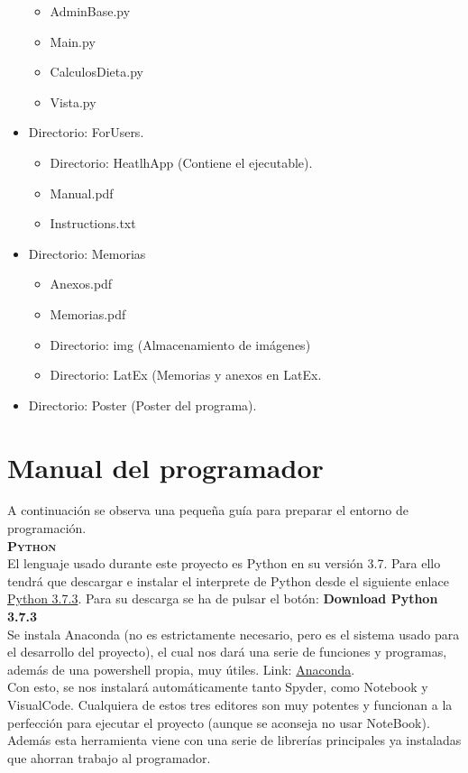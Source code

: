 \begin{itemize}
\begin{itemize}
\item AdminBase.py
\item Main.py
\item CalculosDieta.py
\item Vista.py
\end{itemize}
\item Directorio: ForUsers.
\begin{itemize}
\item Directorio: HeatlhApp (Contiene el ejecutable).
\item Manual.pdf
\item Instructions.txt
\end{itemize}
\item Directorio: Memorias
\begin{itemize}
\item Anexos.pdf
\item Memorias.pdf
\item Directorio: img (Almacenamiento de imágenes)
\item Directorio: LatEx (Memorias y anexos en LatEx.
\end{itemize}
\item Directorio: Poster (Poster del programa).
\end{itemize}
\section{Manual del programador}
A continuación se observa una pequeña guía para preparar el entorno de programación.\\

\textbf{\textsc{Python}}\\
El lenguaje usado durante este proyecto es Python en su versión 3.7. Para ello tendrá que descargar e instalar el interprete de Python desde el siguiente enlace \href{https://www.python.org/downloads/}{Python 3.7.3}. Para su descarga se ha de pulsar el botón: \textbf{Download Python 3.7.3}\\

Se instala Anaconda (no es estrictamente necesario, pero es el sistema usado para el desarrollo del proyecto), el cual nos dará una serie de funciones y programas, además de una powershell propia, muy útiles. Link: \href{https://www.anaconda.com/distribution/}{Anaconda}.\\
Con esto, se nos instalará automáticamente tanto Spyder, como Notebook y VisualCode. Cualquiera de estos tres editores son muy potentes y funcionan a la perfección para ejecutar el proyecto (aunque se aconseja no usar NoteBook). Además esta herramienta viene con una serie de librerías principales ya instaladas que ahorran trabajo al programador.\\

